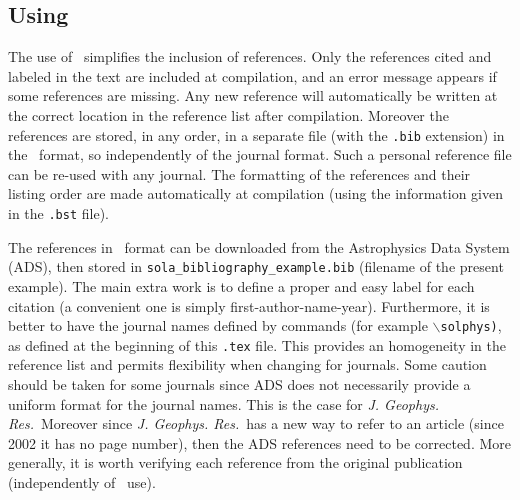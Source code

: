 \documentclass[namedreferences,hyperref,optionalrh,solaromanenum]{spr-sola}
\newcommand{\jgr}{{\it J. Geophys. Res.}}
\begin{document}
\subsection{Using \BibTeX} %
\label{S-BibTeX}
  The use of \BibTeX\ simplifies the inclusion of references. Only the 
references cited and labeled in the text are included at compilation, 
and an error message appears if some references
are missing.  Any new reference will automatically be written at the correct 
location in the reference list after compilation. 
Moreover the references are stored, in any order, in a separate file
(with the \texttt{.bib} extension) in the \BibTeX\ format, so independently of 
the journal format. Such a personal reference file can be re-used with any journal.
The formatting of the references and their listing order are made automatically
at compilation (using the information given in the \texttt{.bst} file). 
        
  The references in \BibTeX\ format can be downloaded from the 
Astrophysics Data System (ADS), then stored
in \verb+sola_bibliography_example.bib+ (file\linebreak name of the present example).
The main extra work is to define a proper and easy label for each citation
(a convenient one is simply first-author-name-year).  Furthermore, it is better
to have the journal names defined by commands (for example 
\texttt{$\backslash$solphys)}, as defined at the beginning of 
this \texttt{.tex} file.
This provides an homogeneity in the reference list and permits flexibility
when changing for journals.   Some caution should be taken for some journals
since ADS does not necessarily provide a uniform format for the
journal names. This is the case for \jgr\  Moreover since
\jgr\ has a new way to refer to an article 
(since 2002 it has no page number), then the ADS references need to be corrected. 
More generally, it is worth verifying
each reference from the original publication (independently of \BibTeX\ use).
\end{document}
